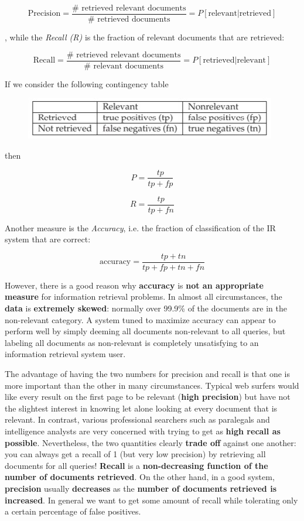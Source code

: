 $$
\text{Precision} = \frac{\text{# retrieved relevant documents}}{\text{# retrieved documents}} = P[\text{relevant} | \text{retrieved}]
$$

, while the \textit{Recall (R)} is the fraction of relevant documents that are retrieved:

$$
\text{Recall} = \frac{\text{# retrieved relevant documents}}{\text{# relevant documents}} = P[\text{retrieved} | \text{relevant}]
$$

If we consider the following contingency table

\begin{figure}[h!]
		\centering
		\includegraphics[scale = 2.0]{img/contingecy table.jpg}
		\label{ct}
\end{figure}

then

$$
P = \frac{tp}{tp + fp}
$$

$$
R = \frac{tp}{tp + fn}
$$

Another measure is the \textit{Accuracy}, i.e. the fraction of classification of the IR system that are correct:

$$
\text{accuracy} = \frac{tp + tn}{tp + fp + tn + fn}
$$

However, there is a good reason why \textbf{accuracy} is \textbf{not an appropriate measure} for information retrieval problems. In almost all circumstances, the \textbf{data} is \textbf{extremely skewed}: normally over 99.9\% of the documents are in the non-relevant category. A system tuned to maximize accuracy can appear to perform well by simply deeming all documents non-relevant to all queries, but labeling all documents as non-relevant is completely unsatisfying to an information retrieval system user. 

The advantage of having the two numbers for precision and recall is that one is more important than the other in many circumstances. Typical web surfers would like every result on the first page to be relevant (\textbf{high precision}) but have not the slightest interest in knowing let alone looking at every document that is relevant. In contrast, various professional searchers such as paralegals and intelligence analysts are very concerned with trying to get as \textbf{high recall as possible}. Nevertheless, the two quantities clearly \textbf{trade off} against one another: you can always get a recall of 1 (but very low precision) by retrieving all documents for all queries! \textbf{Recall} is a \textbf{non-decreasing function of the number of documents retrieved}. On the other hand, in a good system, \textbf{precision} usually \textbf{decreases} as the \textbf{number of documents retrieved is increased}. In general we want to get some amount of recall while tolerating only a certain percentage of false positives.


